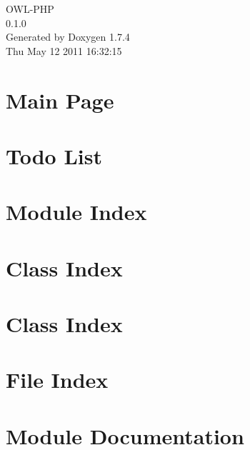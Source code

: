 \documentclass[a4paper]{book}
\begin{document}
\begin{titlepage}
\vspace*{7cm}
\begin{center}
{\Large OWL-\/PHP \\[1ex]\large 0.1.0 }\\
\vspace*{1cm}
{\large Generated by Doxygen 1.7.4}\\
\vspace*{0.5cm}
{\small Thu May 12 2011 16:32:15}\\
\end{center}
\end{titlepage}
\clearemptydoublepage
{}
\tableofcontents
\clearemptydoublepage
{}
\chapter{Main Page}
\label{index}
\chapter{Todo List}
\label{todo}

\chapter{Module Index}

\chapter{Class Index}

\chapter{Class Index}

\chapter{File Index}

\chapter{Module Documentation}






\end{document}
